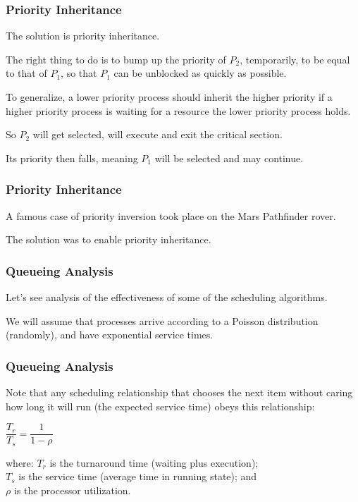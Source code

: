 \begin{frame}
\frametitle{Priority Inheritance}

The solution is \alert{priority inheritance}. 

The right thing to do is to bump up the priority of $P_{2}$, temporarily, to be equal to that of $P_{1}$, so that $P_{1}$ can be unblocked as quickly as possible. 

To generalize, a lower priority process should inherit the higher priority if a higher priority process is waiting for a resource the lower priority process holds. 

So $P_{2}$ will get selected, will execute and exit the critical section. 

Its priority then falls, meaning $P_{1}$ will be selected and may continue.

\end{frame}

\begin{frame}
\frametitle{Priority Inheritance}

A famous case of priority inversion took place on the Mars Pathfinder rover.

The solution was to enable priority inheritance.

\end{frame}

\begin{frame}
\frametitle{Queueing Analysis}

Let's see analysis of the effectiveness of some of the scheduling algorithms. 

We will assume that processes arrive according to a Poisson distribution (randomly), and have exponential service times. 

\end{frame}

\begin{frame}
\frametitle{Queueing Analysis}

Note that any scheduling relationship that chooses the next item without caring how long it will run (the expected service time) obeys this relationship:

\begin{center}
	$\dfrac{T_{r}}{T_{s}} = \dfrac{1}{1 - \rho}$
\end{center}

where: $T_{r}$ is the turnaround time (waiting plus execution);\\
\quad $T_{s}$ is the service time (average time in running state); and \\
\quad $\rho$ is the processor utilization.


\end{frame}

